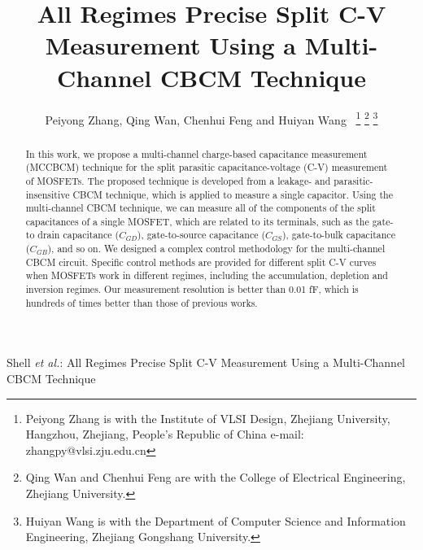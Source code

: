 \documentclass[journal]{IEEEtran}
\begin{document}
%

\title{All Regimes Precise Split C-V Measurement Using a Multi-Channel CBCM Technique}
%


\author{Peiyong Zhang, Qing Wan, Chenhui Feng and Huiyan Wang~%
\thanks{Peiyong Zhang is with the Institute of VLSI Design, Zhejiang University, Hangzhou, Zhejiang, People's Republic of China e-mail: zhangpy@vlsi.zju.edu.cn }%
\thanks{Qing Wan and Chenhui Feng are with the College of Electrical Engineering, Zhejiang University.}%
\thanks{Huiyan Wang is with the Department of Computer Science and Information Engineering, Zhejiang Gongshang University.}}




%
{Shell \MakeLowercase{\textit{et al.}}: All Regimes Precise Split C-V Measurement Using a Multi-Channel CBCM Technique}





\maketitle


\begin{abstract}
In this work, we propose a multi-channel charge-based capacitance measurement (MCCBCM) technique for the split parasitic capacitance-voltage (C-V) measurement of MOSFETs. The proposed technique is developed from a leakage- and parasitic-insensitive CBCM technique, which is applied to measure a single capacitor. Using the multi-channel CBCM technique, we can measure all of the components of the split capacitances of a single MOSFET, which are related to its terminals, such as the gate-to drain capacitance ($C_{GD}$), gate-to-source capacitance ($C_{GS}$), gate-to-bulk capacitance ($C_{GB}$), and so on. We designed a complex control methodology for the multi-channel CBCM circuit. Specific control methods are provided for different split C-V curves when MOSFETs work in different regimes, including the accumulation, depletion and inversion regimes. Our measurement resolution is better than 0.01 fF, which is hundreds of times better than those of previous works.

\end{abstract}
\end{document}
